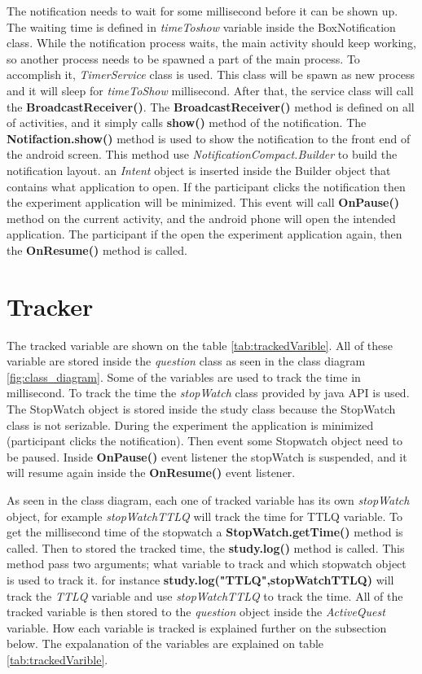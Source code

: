 The notification needs to wait for some millisecond before it can be shown up. The waiting time is defined in \textit{timeToshow} variable inside the BoxNotification class.
While the notification process waits, the main activity should keep working, so another process needs to be spawned a part of the main process.
To accomplish it, \textit{TimerService} class is used. This class will be spawn as new process and it will sleep for \textit{timeToShow} millisecond.
After that, the service class will call the \textbf{BroadcastReceiver()}.
The \textbf{BroadcastReceiver()} method  is defined on all of activities, and it simply calls \textbf{show()} method of the notification.
The \textbf{Notifaction.show()} method is used to show  the notification to the front end of the android screen. This method use
 \textit{NotificationCompact.Builder} to build the notification layout.
 an \textit{Intent} object is inserted inside the Builder object that contains what application to open.
 If the participant clicks the notification then the experiment application will be minimized.
 This event will call \textbf{OnPause()} method on the current activity, and the android phone will open the intended application.
 The participant if the open the experiment application again, then the \textbf{OnResume()} method is called.


\section{Tracker}

The tracked variable are shown on the table \ref{tab:trackedVarible}.
All of these variable are stored inside the \textit{question} class as seen in the class diagram \ref{fig:class_diagram}.
Some of the variables are used to track the time in millisecond.
To track the time the \textit{stopWatch} class provided by java API is used.
The StopWatch object is stored inside the study class because the StopWatch class is not serizable.
During the experiment the application is minimized (participant clicks the notification).
Then event some Stopwatch object need to be paused. Inside \textbf{OnPause()} event listener the stopWatch is suspended,
and it will resume again inside the \textbf{OnResume()} event listener.

As seen in the class diagram, each one of tracked variable has its own \textit{stopWatch} object, for example \textit{stopWatchTTLQ} will track the time for TTLQ variable.
To get the millisecond time of the stopwatch a \textbf{StopWatch.getTime()} method is called.
Then to stored the tracked time, the \textbf{study.log()} method is called.
This method pass two arguments; what variable to track and which stopwatch object is used to track it.
for instance \textbf{study.log("TTLQ",stopWatchTTLQ)} will track the \textit{TTLQ} variable and use \textit{stopWatchTTLQ} to track the time.
All of the tracked variable is then stored to the \textit{question} object inside the \textit{ActiveQuest} variable.
How each variable is tracked is explained further on the subsection below.
The expalanation of the variables are explained on table \ref{tab:trackedVarible}.

